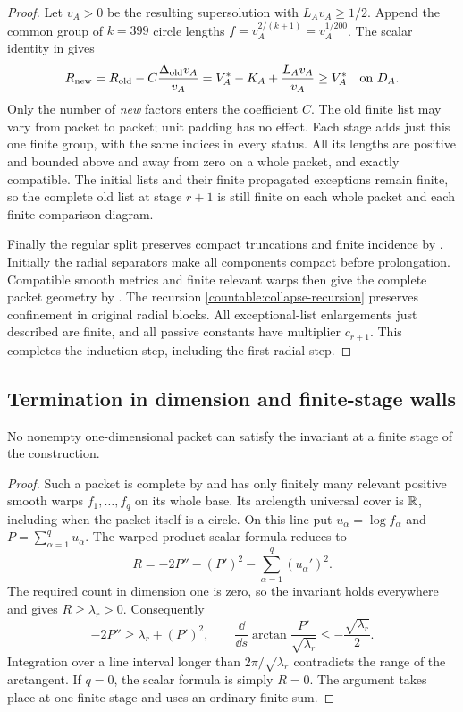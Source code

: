 \begin{proof}
Let $v_A>0$ be the resulting supersolution with $L_Av_A\ge1/2$.
Append the common group of $k=399$ circle lengths
$f=v_A^{2/(k+1)}=v_A^{1/200}$. The scalar identity in
 gives
\[
 R_{\rm new}=R_{\rm old}-C\frac{\Delta_{\rm old}v_A}{v_A}
           =V_A^*-K_A+\frac{L_Av_A}{v_A}
           \ge V_A^*\quad\hbox{on }D_A.
\]
Only the number of \emph{new} factors enters the coefficient $C$.
The old finite list may vary from packet to packet; unit padding has
no effect. Each stage adds just this one finite group, with the same
indices in every status. All its lengths are positive and bounded
above and away from zero on a whole packet, and exactly compatible.
The initial lists and their finite propagated exceptions remain finite,
so the complete old list at stage $r+1$ is still finite on each whole
packet and each finite comparison diagram.

Finally the regular split preserves compact truncations and finite
incidence by . Initially the radial separators make
all components compact before prolongation. Compatible smooth metrics
and finite relevant warps then give the complete packet geometry by
. The recursion
\eqref{countable:collapse-recursion} preserves confinement in original
radial blocks. All exceptional-list enlargements just described are
finite, and all passive constants have multiplier $c_{r+1}$.
This completes the induction step, including the first radial step.
\end{proof}

\subsection{Termination in dimension and finite-stage walls}

\begin{lemma}\label{countable:dimension-one}
No nonempty one-dimensional packet can satisfy the invariant at a
finite stage of the construction.
\end{lemma}

\begin{proof}
Such a packet is complete by  and has only
finitely many relevant positive smooth warps $f_1,\ldots,f_q$ on
its whole base. Its arclength universal cover is $\mathbb R$, including
when the packet itself is a circle. On this line put
$u_\alpha=\log f_\alpha$ and $P=\sum_{\alpha=1}^q u_\alpha$.
The warped-product scalar formula reduces to
\[
 R=-2P''-(P')^2-\sum_{\alpha=1}^q(u_\alpha')^2.
\]
The required count in dimension one is zero, so the invariant holds
everywhere and gives $R\ge\lambda_r>0$. Consequently
\[
 -2P''\ge\lambda_r+(P')^2,\qquad
 \frac{\dd}{\dd s}\arctan\frac{P'}{\sqrt{\lambda_r}}
 \le-\frac{\sqrt{\lambda_r}}2.
\]
Integration over a line interval longer than
$2\pi/\sqrt{\lambda_r}$ contradicts the range of the arctangent.
If $q=0$, the scalar formula is simply $R=0$. The argument takes
place at one finite stage and uses an ordinary finite sum.
\end{proof}

